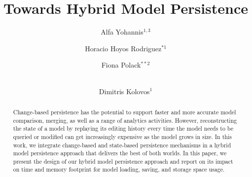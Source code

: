 \documentclass{llncs}
\begin{document}
\renewcommand{\thelstlisting}{\arabic{lstlisting}}
\renewcommand{\labelitemi}{$\bullet$}
\newcommand{\dk}[1]{\textbf{[DK: #1]}}

\title{Towards Hybrid Model Persistence}
%
%
\author{
Alfa Yohannis$^{1,3}$ \and Horacio Hoyos Rodriguez$^{*1}$ \and Fiona Polack$^{**2}$ \and \\ Dimitris Kolovos$^{1}$
}
%
%



\maketitle      %
\begin{abstract}
Change-based persistence has the potential to support faster and more accurate model comparison, merging, as well as a range of analytics activities. However, reconstructing the state of a model by replaying its editing history every time the model needs to be queried or modified can get increasingly expensive as the model grows in size. In this work, we integrate change-based and state-based persistence mechanisms in a hybrid model persistence approach that delivers the best of both worlds. In this paper, we present the design of our hybrid model persistence approach and report on its impact on time and memory footprint for model loading, saving, and storage space usage.
\end{abstract}
\end{document}

